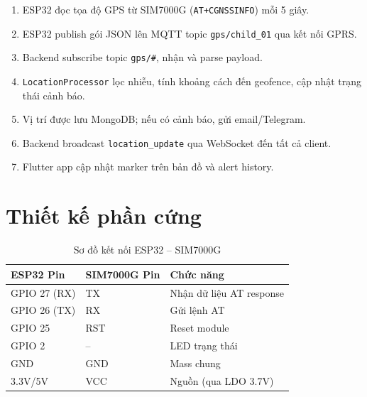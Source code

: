 \documentclass[13pt, a4paper]{report}
\begin{document}
\begin{enumerate}
  \item ESP32 đọc tọa độ GPS từ SIM7000G (\texttt{AT+CGNSSINFO}) mỗi 5 giây.
  \item ESP32 publish gói JSON lên MQTT topic \texttt{gps/child\_01} qua kết nối GPRS.
  \item Backend subscribe topic \texttt{gps/\#}, nhận và parse payload.
  \item \texttt{LocationProcessor} lọc nhiễu, tính khoảng cách đến geofence, cập nhật trạng thái cảnh báo.
  \item Vị trí được lưu MongoDB; nếu có cảnh báo, gửi email/Telegram.
  \item Backend broadcast \texttt{location\_update} qua WebSocket đến tất cả client.
  \item Flutter app cập nhật marker trên bản đồ và alert history.
\end{enumerate}

\section{Thiết kế phần cứng}

\begin{table}[H]
\centering
\caption{Sơ đồ kết nối ESP32 -- SIM7000G}
\label{tab:hardware_pinout}
\begin{tabular}{l l l}
\toprule
\textbf{ESP32 Pin} & \textbf{SIM7000G Pin} & \textbf{Chức năng} \\
\midrule
GPIO 27 (RX) & TX  & Nhận dữ liệu AT response \\
GPIO 26 (TX) & RX  & Gửi lệnh AT \\
GPIO 25      & RST & Reset module \\
GPIO 2       & --  & LED trạng thái \\
GND          & GND & Mass chung \\
3.3V/5V      & VCC & Nguồn (qua LDO 3.7V) \\
\bottomrule
\end{tabular}
\end{table}
\end{document}

